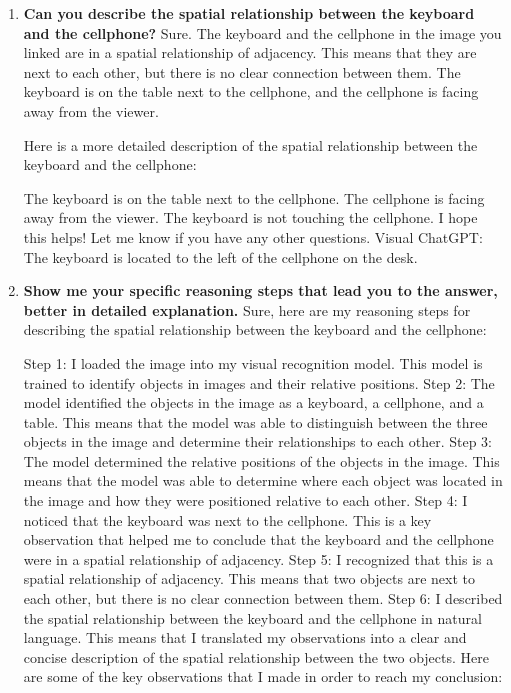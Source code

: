     \begin{enumerate}
        \item \textbf{Can you describe the spatial relationship between the keyboard and the cellphone?}
        \subitem Sure. The keyboard and the cellphone in the image you linked are in a spatial relationship of adjacency. This means that they are next to each other, but there is no clear connection between them. The keyboard is on the table next to the cellphone, and the cellphone is facing away from the viewer.

        Here is a more detailed description of the spatial relationship between the keyboard and the cellphone:
        
        The keyboard is on the table next to the cellphone.
        The cellphone is facing away from the viewer.
        The keyboard is not touching the cellphone.
        I hope this helps! Let me know if you have any other questions.
        \subitem Visual ChatGPT: The keyboard is located to the left of the cellphone on the desk.
        \item \textbf{Show me your specific reasoning steps that lead you to the answer, better in detailed explanation.}
        \subitem 
        Sure, here are my reasoning steps for describing the spatial relationship between the keyboard and the cellphone:
        
        Step 1: I loaded the image into my visual recognition model. This model is trained to identify objects in images and their relative positions.
        Step 2: The model identified the objects in the image as a keyboard, a cellphone, and a table. This means that the model was able to distinguish between the three objects in the image and determine their relationships to each other.
        Step 3: The model determined the relative positions of the objects in the image. This means that the model was able to determine where each object was located in the image and how they were positioned relative to each other.
        Step 4: I noticed that the keyboard was next to the cellphone. This is a key observation that helped me to conclude that the keyboard and the cellphone were in a spatial relationship of adjacency.
        Step 5: I recognized that this is a spatial relationship of adjacency. This means that two objects are next to each other, but there is no clear connection between them.
        Step 6: I described the spatial relationship between the keyboard and the cellphone in natural language. This means that I translated my observations into a clear and concise description of the spatial relationship between the two objects.
        Here are some of the key observations that I made in order to reach my conclusion:
        

\end{enumerate}

